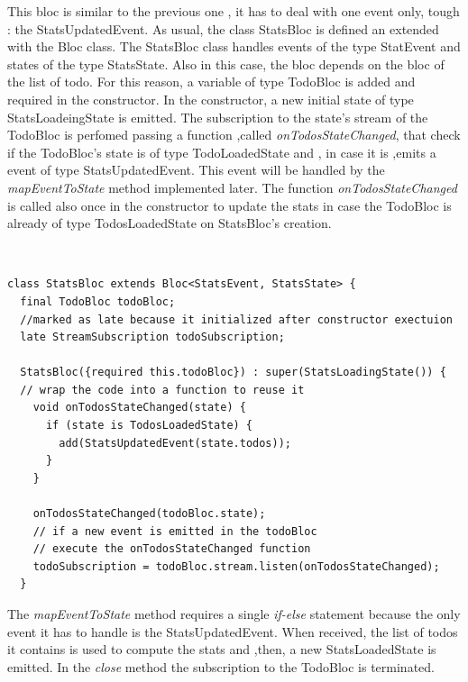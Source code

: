 This bloc is similar to the previous one , it has to deal with one event only, tough : the StatsUpdatedEvent. As usual, the class StatsBloc is defined an extended with the Bloc class. The StatsBloc class handles events of the type StatEvent and states of the type StatsState. Also in this case, the bloc depends on the bloc of the list of todo. For this reason, a variable of type TodoBloc is added and required in the constructor. In the constructor, a new initial state of type StatsLoadeingState is emitted. The subscription to the state's stream of the TodoBloc is perfomed passing a function ,called \textit{onTodosStateChanged}, that check if the TodoBloc’s state is of type TodoLoadedState and , in case it is ,emits a event of type StatsUpdatedEvent. This event will be handled by the \textit{mapEventToState} method implemented later. The function \textit{onTodosStateChanged} is called also once in the constructor to update the stats in case the TodoBloc is already of type TodosLoadedState on StatsBloc's creation.
\begin{code}
\mbox{}\\
 \mbox{}
\label{code:2.14}
\begin{verbatim}
class StatsBloc extends Bloc<StatsEvent, StatsState> {
  final TodoBloc todoBloc;
  //marked as late because it initialized after constructor exectuion
  late StreamSubscription todoSubscription;

  StatsBloc({required this.todoBloc}) : super(StatsLoadingState()) {
  // wrap the code into a function to reuse it
    void onTodosStateChanged(state) {
      if (state is TodosLoadedState) {
        add(StatsUpdatedEvent(state.todos));
      }
    }

    onTodosStateChanged(todoBloc.state);
 	// if a new event is emitted in the todoBloc
 	// execute the onTodosStateChanged function
    todoSubscription = todoBloc.stream.listen(onTodosStateChanged);
  }
\end{verbatim}
\mbox{}
\end{code}

The \textit{mapEventToState} method requires a single \textit{if-else} statement because the only event it has to handle is the StatsUpdatedEvent. When received, the list of todos it contains is used to compute the stats and ,then, a new StatsLoadedState is emitted. 
In the \textit{close} method the subscription to the TodoBloc is terminated.

